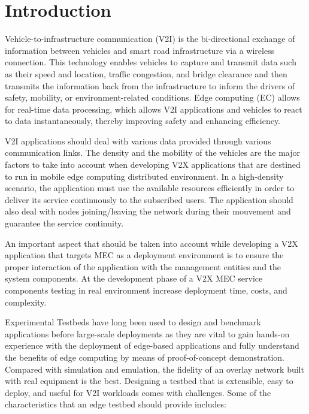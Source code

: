 \documentclass[conference]{IEEEtran}
\begin{document}
\section{Introduction}
\par Vehicle-to-infrastructure communication (V2I) is the bi-directional exchange of information between vehicles and smart road infrastructure via a wireless connection.
This technology enables vehicles to capture and transmit data such as their speed and location, traffic congestion, and bridge clearance and then transmits the information back from the infrastructure to inform the drivers of safety, mobility, or environment-related conditions. Edge computing (EC) allows for real-time data processing, which allows V2I applications and vehicles to react to data instantaneously, thereby improving safety and enhancing efficiency.
\par V2I applications should deal with various data provided through various communication links. The density and the
mobility of the vehicles are the major factors to take into account when developing V2X applications that are destined to run in mobile edge computing distributed environment. In a high-density scenario, the application must use the available resources efficiently in order to deliver its service continuously to the subscribed users. The application should also deal with nodes joining/leaving the network during their mouvement and guarantee the service continuity. 
\par An important aspect that should be taken into account while developing a V2X application that targets MEC as a deployment environment is to ensure the proper interaction of the application with the management entities and the system components. At the development phase of a V2X MEC service components testing in real environment increase deployment time, costs, and complexity. 
\par Experimental Testbeds have long been used to design and benchmark applications before large-scale deployments\cite{berman2014geni,ertin2006kansei,keahey2020lessons} as they are vital to gain hands-on experience with the deployment of edge-based applications and fully understand the benefits of edge computing by means of proof-of-concept demonstration. Compared with simulation and emulation, the fidelity of an overlay network built with real
equipment is the best.  
Designing a testbed that is extensible, easy to deploy, and useful for V2I workloads comes with challenges. 
Some of the characteristics that an edge testbed should provide\cite{boubin2022prowess} includes: 
\end{document}
